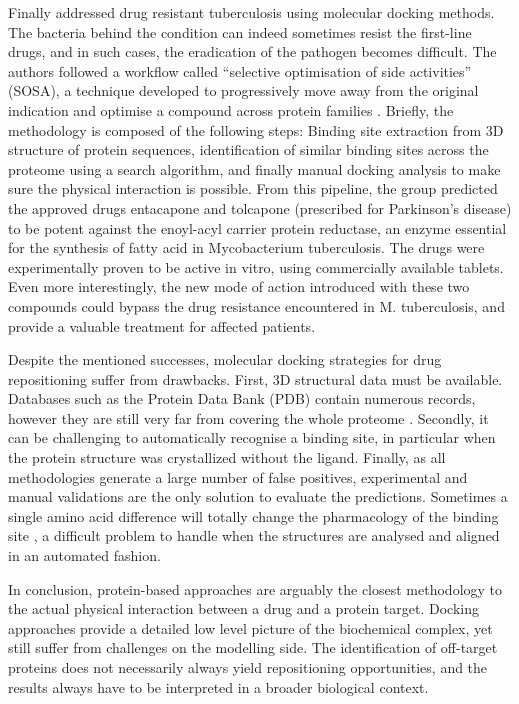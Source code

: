 Finally \cite{kinnings2009drug} addressed drug resistant tuberculosis using molecular docking methods. The bacteria behind the condition can indeed sometimes resist the first-line drugs, and in such cases, the eradication of the pathogen becomes difficult. The authors followed a workflow called “selective optimisation of side activities” (SOSA), a technique developed to progressively move away from the original indication and optimise a compound across protein families \citep{wermuth2006selective}. Briefly, the methodology is composed of the following steps: Binding site extraction from 3D structure of protein sequences, identification of similar binding sites across the proteome using a search algorithm, and finally manual docking analysis to make sure the physical interaction is possible. From this pipeline, the group predicted the approved drugs entacapone and tolcapone (prescribed for Parkinson’s disease) to be potent against the enoyl-acyl carrier protein reductase, an enzyme essential for the synthesis of fatty acid in Mycobacterium tuberculosis. The drugs were experimentally proven to be active in vitro, using commercially available tablets. Even more interestingly, the new mode of action introduced with these two compounds could bypass the drug resistance encountered in M. tuberculosis, and provide a valuable treatment for affected patients.

Despite the mentioned successes, molecular docking strategies for drug repositioning suffer from drawbacks. First, 3D structural data must be available. Databases such as the Protein Data Bank (PDB) contain numerous records, however they are still very far from covering the whole proteome \citep{haupt2011old}. Secondly, it can be challenging to automatically recognise a binding site, in particular when the protein structure was crystallized without the ligand. Finally, as all methodologies generate a large number of false positives, experimental and manual validations are the only solution to evaluate the predictions. Sometimes a single amino acid difference will totally change the pharmacology of the binding site \citep{kruger2012mapping}, a difficult problem to handle when the structures are analysed and aligned in an automated fashion.

In conclusion, protein-based approaches are arguably the closest methodology to the actual physical interaction between a drug and a protein target. Docking approaches provide a detailed low level picture of the biochemical complex, yet still suffer from challenges on the modelling side. The identification of off-target proteins does not necessarily always yield repositioning opportunities, and the results always have to be interpreted in a broader biological context.

